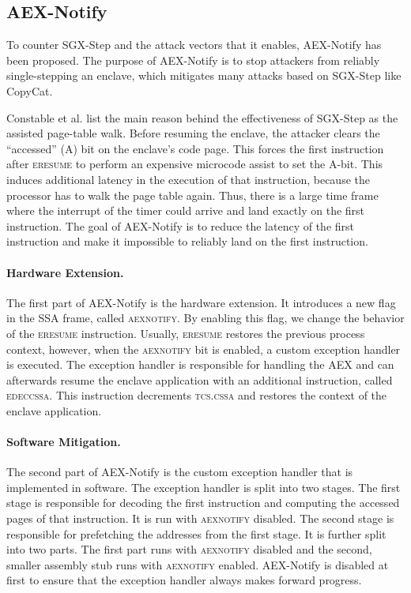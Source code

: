 \documentclass{llncs}
\begin{document}

\subsection{AEX-Notify}
\label{sec:aex-notify}

To counter SGX-Step and the attack vectors that it enables, AEX-Notify has been proposed.
The purpose of AEX-Notify is to stop attackers from reliably single-stepping an enclave,
which mitigates many attacks based on SGX-Step like CopyCat.

Constable et al. \cite{ConstableBCXXAK23} list the main reason
behind the effectiveness of SGX-Step as the assisted page-table walk.
Before resuming the enclave, the attacker clears
the ``accessed'' (A) bit on the enclave's code page.
This forces the first instruction after \textsc{eresume}
to perform an expensive microcode assist to set the A-bit.
This induces additional latency in the execution of that instruction, because
the processor has to walk the page table again.
Thus, there is a large time frame where the interrupt of the timer could
arrive and land exactly on the first instruction.
The goal of AEX-Notify is to reduce the latency of the first instruction
and make it impossible to reliably land on the first instruction.

\paragraph{Hardware Extension.}
The first part of AEX-Notify is the hardware extension.
It introduces a new flag in the SSA frame, called \textsc{aexnotify}.
By enabling this flag, we change the behavior of the \textsc{eresume} instruction.
Usually, \textsc{eresume} restores the previous process context,
however, when the \textsc{aexnotify} bit is enabled,
a custom exception handler is executed.
The exception handler is responsible for handling the AEX and
can afterwards resume the enclave application with an additional instruction, called \textsc{edeccssa}.
This instruction decrements \textsc{tcs.cssa} and restores the context of the enclave application.

\paragraph{Software Mitigation.}
The second part of AEX-Notify is the custom exception handler that is implemented in software.
The exception handler is split into two stages.
The first stage is responsible for decoding the first instruction and
computing the accessed pages of that instruction.
It is run with \textsc{aexnotify} disabled.
The second stage is responsible for prefetching the addresses from the first stage.
It is further split into two parts.
The first part runs with \textsc{aexnotify} disabled
and the second, smaller assembly stub runs with \textsc{aexnotify} enabled.
AEX-Notify is disabled at first to ensure that the exception handler always makes forward progress.
\end{document}
